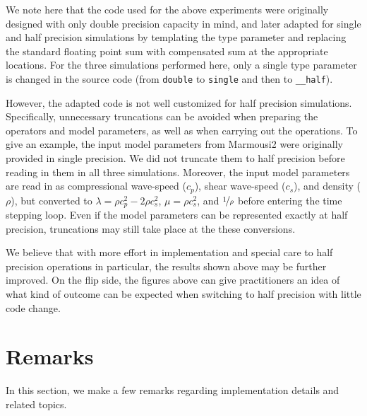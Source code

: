 \documentclass[10pt]{article}
\begin{document}
We note here that the code used for the above experiments were originally designed with only double precision capacity in mind, and later adapted for single and half precision simulations by templating the type parameter and replacing the standard floating point sum with compensated sum at the appropriate locations. 
%
For the three simulations performed here, only a single type parameter is changed in the source code (from \texttt{double} to \texttt{single} and then to \texttt{\_\_half}).

However, the adapted code is not well customized for half precision simulations. 
%
Specifically, unnecessary truncations can be avoided when preparing the operators and model parameters, as well as when carrying out the operations. 
%
To give an example, the input model parameters from Marmousi2 were originally provided in single precision. 
%
We did not truncate them to half precision before reading in them in all three simulations. 
%
Moreover, the input model parameters are read in as compressional wave-speed ($c_p$), shear wave-speed ($c_s$), and density ($\rho$), but converted to $\lambda = \rho c_p^2 - 2 \rho c_s^2$, $\mu = \rho c_s^2$, and $\nicefrac{1}{\rho}$ before entering the time stepping loop. 
%
Even if the model parameters can be represented exactly at half precision, truncations may still take place at the these conversions.


We believe that with more effort in implementation and special care to half precision operations in particular, the results shown above may be further improved.
%
On the flip side, the figures above can give practitioners an idea of what kind of outcome can be expected when switching to half precision with little code change.


\section{Remarks}\label{sec_remarks}
%
In this section, we make a few remarks regarding implementation details and related topics.
\end{document}
